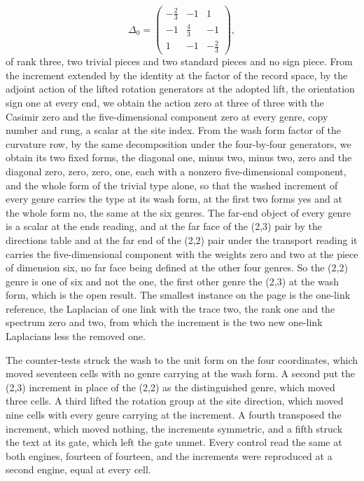 \begin{chproof}
\begin{equation}
\Delta_{0} = \begin{pmatrix} -\tfrac{2}{3} & -1 & 1 \\ -1 & \tfrac{4}{3} & -1 \\ 1 & -1 & -\tfrac{2}{3} \end{pmatrix} ,
\end{equation}
of rank three, two trivial pieces and two standard pieces and no sign piece. From the increment extended by the identity at the factor of the record space, by the adjoint action of the lifted rotation generators at the adopted lift, the orientation sign one at every end, we obtain the action zero at three of three with the Casimir zero and the five-dimensional component zero at every genre, copy number and rung, a scalar at the site index. From the wash form factor of the curvature row, by the same decomposition under the four-by-four generators, we obtain its two fixed forms, the diagonal one, minus two, minus two, zero and the diagonal zero, zero, zero, one, each with a nonzero five-dimensional component, and the whole form of the trivial type alone, so that the washed increment of every genre carries the type at its wash form, at the first two forms yes and at the whole form no, the same at the six genres. The far-end object of every genre is a scalar at the ends reading, and at the far face of the (2,3) pair by the directions table and at the far end of the (2,2) pair under the transport reading it carries the five-dimensional component with the weights zero and two at the piece of dimension six, no far face being defined at the other four genres. So the (2,2) genre is one of six and not the one, the first other genre the (2,3) at the wash form, which is the open result. The smallest instance on the page is the one-link reference, the Laplacian of one link with the trace two, the rank one and the spectrum zero and two, from which the increment is the two new one-link Laplacians less the removed one.

The counter-tests struck the wash to the unit form on the four coordinates, which moved seventeen cells with no genre carrying at the wash form. A second put the (2,3) increment in place of the (2,2) as the distinguished genre, which moved three cells. A third lifted the rotation group at the site direction, which moved nine cells with every genre carrying at the increment. A fourth transposed the increment, which moved nothing, the increments symmetric, and a fifth struck the text at its gate, which left the gate unmet. Every control read the same at both engines, fourteen of fourteen, and the increments were reproduced at a second engine, equal at every cell.
\end{chproof}
